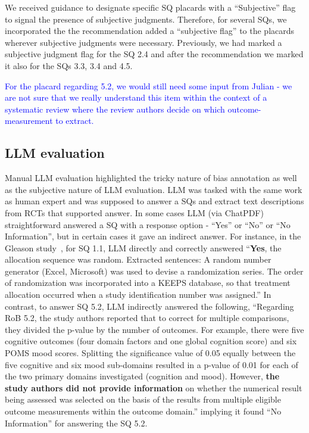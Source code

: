 \documentclass[sn-mathphys,Numbered]{sn-jnl}%
\theoremstyle{thmstyleone}%
\theoremstyle{thmstyletwo}%
\theoremstyle{thmstylethree}%
\begin{document}
We received guidance to designate specific SQ placards with a ``Subjective'' flag to signal the presence of subjective judgments.
Therefore, for several SQs, we incorporated the the recommendation added a ``subjective flag'' to the placards wherever subjective judgments were necessary.
Previously, we had marked a subjective judgment flag for the SQ 2.4 and after the recommendation we marked it also for the SQs 3.3, 3.4 and 4.5.


\textcolor{blue}{For the placard regarding 5.2, we would still need some input from Julian - we are not sure that we really understand this item within the context of a systematic review where the review authors decide on which outcome-measurement to extract. }
%
%
%
\subsection{LLM evaluation}
\label{disc:llm}
%
Manual LLM evaluation highlighted the tricky nature of bias annotation as well as the subjective nature of LLM evaluation.
LLM was tasked with the same work as human expert and was supposed to answer a SQs and extract text descriptions from RCTs that supported answer.
In some cases LLM (via ChatPDF) straightforward answered a SQ with a response option - ``Yes'' or ``No'' or ``No Information'', but in certain cases it gave an indirect answer.
For instance, in the Gleason study~\cite{gleason2015effects}, for SQ 1.1, LLM directly and correctly answered ``\textbf{Yes}, the allocation sequence was random. Extracted sentences: A random number generator (Excel, Microsoft) was used to devise a randomization series. The order of randomization was incorporated into a KEEPS database, so that treatment allocation occurred when a study identification number was assigned.''
In contrast, to answer SQ 5.2, LLM indirectly answered the following, ``Regarding RoB 5.2, the study authors reported that to correct for multiple comparisons, they divided the p-value by the number of outcomes. For example, there were five cognitive outcomes (four domain factors and one global cognition score) and six POMS mood scores. Splitting the significance value of 0.05 equally between the five cognitive and six mood sub-domains resulted in a p-value of 0.01 for each of the two primary domains investigated (cognition and mood). However, \textbf{the study authors did not provide information} on whether the numerical result being assessed was selected on the basis of the results from multiple eligible outcome measurements within the outcome domain.'' implying it found ``No Information'' for answering the SQ 5.2.
\end{document}
